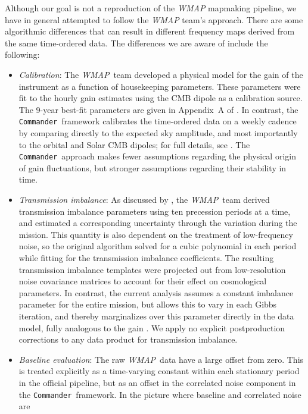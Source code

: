 \documentclass[twocolumn]{aa}
\def\WMAP{\emph{WMAP}}
\def\commander{\texttt{Commander}}
\begin{document}
Although our goal is not a reproduction of the \WMAP{} mapmaking pipeline, we
have in general attempted to follow the \WMAP{} team's approach.  There are
some algorithmic differences that can result in different frequency maps
derived from the same time-ordered data. The differences we are aware of include
the following:
\begin{itemize}
\item \emph{Calibration}: The \WMAP\ team developed a physical
  model for the gain of the instrument as a function of housekeeping
  parameters. These parameters were fit to the hourly gain estimates
  using the CMB dipole as a calibration source. The 9-year best-fit
  parameters are given in Appendix~A of \citet{wmapexsupp}. In
  contrast, the \commander\ framework calibrates the time-ordered data on a
  weekly cadence by comparing directly to the expected sky amplitude,
  and most importantly to the orbital and Solar CMB dipoles; for full
  details, see \citet{bp07}. The \commander\ approach makes fewer
  assumptions regarding the physical origin of gain fluctuations, but
  stronger assumptions regarding their stability in time.
\item \emph{Transmission imbalance}: As discussed by
  \citet{jarosik2003,jarosik2007}, the \WMAP\ team derived
  transmission imbalance parameters using ten precession periods at a time, and
  estimated a corresponding uncertainty through the variation during
  the mission. This quantity is also dependent on the treatment of
  low-frequency noise, so the original algorithm solved for  a cubic polynomial in each period
  while fitting for the transmission imbalance coefficients. The
  resulting transmission imbalance templates were projected out from
  low-resolution noise covariance matrices to account for their effect
  on cosmological parameters.  In contrast, the current analysis assumes a constant
  imbalance parameter for the entire mission, but allows this to vary
  in each Gibbs iteration, and thereby marginalizes over this parameter
  directly in the data model, fully analogous to the gain
  \citep{bp07}. We apply no explicit postproduction corrections to any data
  product for transmission imbalance.
\item \emph{Baseline evaluation}: The raw \WMAP\ data have a large
  offset from zero. This is treated explicitly as a time-varying
  constant within each stationary period in the official pipeline, but
  as an offset in the correlated noise component in the \commander\
  framework. In the picture where baseline and correlated noise are

\end{itemize}
\end{document}
